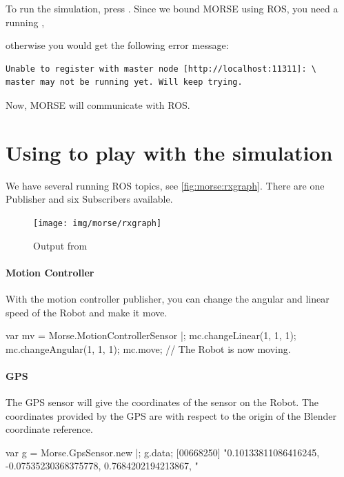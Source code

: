 To run the simulation, press .  Since we bound MORSE using ROS, you
need a running ,


\noindent
otherwise you would get the following error message:

\begin{verbatim}
Unable to register with master node [http://localhost:11311]: \
master may not be running yet. Will keep trying.
\end{verbatim}

Now, MORSE will communicate with ROS.

\section{Using \urbi to play with the simulation}

We have several running ROS topics, see \autoref{fig:morse:rxgraph}.  There
are one Publisher and six Subscribers available.

\begin{figure}[htp]
  \centering
  \texttt{[image: img/morse/rxgraph]}
  \caption{Output from }
  \label{fig:morse:rxgraph}
\end{figure}

\paragraph{Motion Controller}

With the motion controller publisher, you can change the angular and linear
speed of the Robot and make it move.

\begin{urbiunchecked}
var mv = Morse.MotionControllerSensor |;
mc.changeLinear(1, 1, 1);
mc.changeAngular(1, 1, 1);
mc.move;
// The Robot is now moving.
\end{urbiunchecked}

\paragraph{GPS}

The GPS sensor will give the coordinates of the sensor on the Robot.  The
coordinates provided by the GPS are with respect to the origin of the
Blender coordinate reference.

\begin{urbiunchecked}
var g = Morse.GpsSensor.new |;
g.data;
[00668250] "0.10133811086416245, -0.07535230368375778, 0.7684202194213867, "
\end{urbiunchecked}

